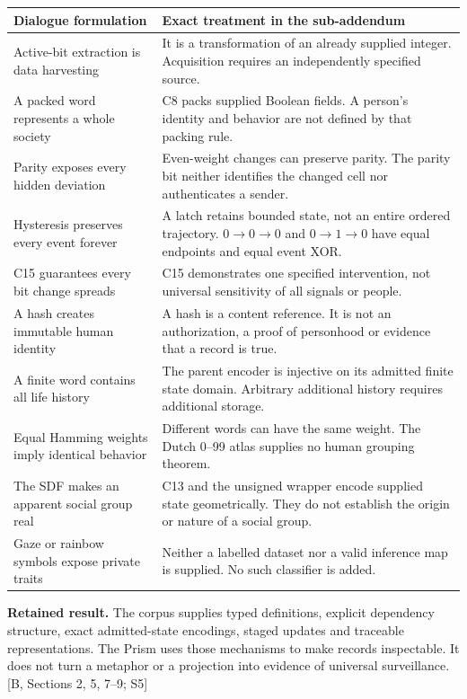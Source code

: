 \documentclass[11pt,a4paper]{article}
\newcommand{\source}[1]{{\sffamily\small\color{slate}[#1]}}
\begin{document}
\begin{center}\small\begin{tabularx}{\textwidth}{@{}p{}X@{}}\toprule
\textbf{Dialogue formulation} & \textbf{Exact treatment in the sub-addendum}\\\midrule
Active-bit extraction is data harvesting & It is a transformation of an already supplied integer. Acquisition requires an independently specified source.\\[7pt]
A packed word represents a whole society & C8 packs supplied Boolean fields. A person's identity and behavior are not defined by that packing rule.\\[7pt]
Parity exposes every hidden deviation & Even-weight changes can preserve parity. The parity bit neither identifies the changed cell nor authenticates a sender.\\[7pt]
Hysteresis preserves every event forever & A latch retains bounded state, not an entire ordered trajectory. $0\to0\to0$ and $0\to1\to0$ have equal endpoints and equal event XOR.\\[7pt]
C15 guarantees every bit change spreads & C15 demonstrates one specified intervention, not universal sensitivity of all signals or people.\\[7pt]
A hash creates immutable human identity & A hash is a content reference. It is not an authorization, a proof of personhood or evidence that a record is true.\\[7pt]
A finite word contains all life history & The parent encoder is injective on its admitted finite state domain. Arbitrary additional history requires additional storage.\\[7pt]
Equal Hamming weights imply identical behavior & Different words can have the same weight. The Dutch 0--99 atlas supplies no human grouping theorem.\\[7pt]
The SDF makes an apparent social group real & C13 and the unsigned wrapper encode supplied state geometrically. They do not establish the origin or nature of a social group.\\[7pt]
Gaze or rainbow symbols expose private traits & Neither a labelled dataset nor a valid inference map is supplied. No such classifier is added.\\\bottomrule
\end{tabularx}\end{center}

\textbf{Retained result.} The corpus supplies typed definitions, explicit dependency structure, exact admitted-state encodings, staged updates and traceable representations. The Prism uses those mechanisms to make records inspectable. It does not turn a metaphor or a projection into evidence of universal surveillance. \source{B, Sections 2, 5, 7--9; S5}
\end{document}
